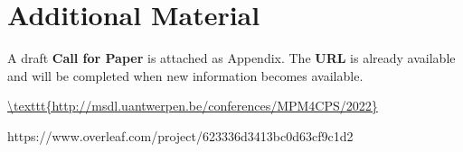 \section{Additional Material}
\label{sec:Appendix}

A draft \textbf{Call for Paper} is attached as Appendix.
The \textbf{URL} is already available and will be completed when new information
becomes available.

\noindent
\url{\texttt{http://msdl.uantwerpen.be/conferences/MPM4CPS/2022}}

\newpage


https://www.overleaf.com/project/623336d3413bc0d63cf9c1d2